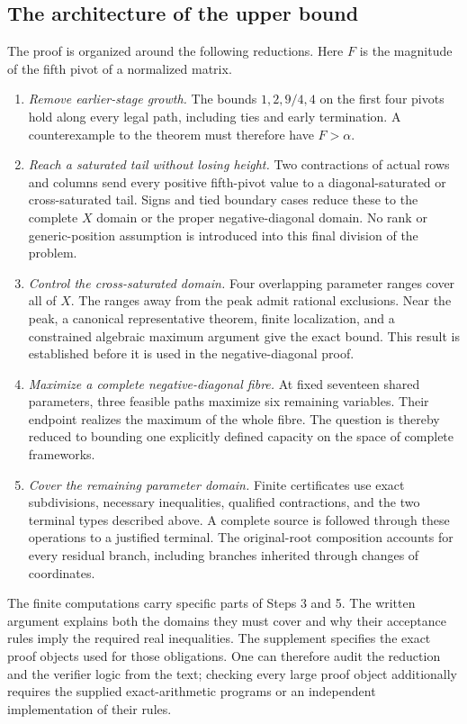 \documentclass[11pt,reqno]{amsart}
\theoremstyle{definition}
\theoremstyle{remark}
\begin{document}
\subsection*{The architecture of the upper bound}
The proof is organized around the following reductions. Here \(F\) is
the magnitude of the fifth pivot of a normalized matrix.
\begin{enumerate}
\item \emph{Remove earlier-stage growth.}
The bounds \(1,2,9/4,4\) on the first four pivots hold along every
legal path, including ties and early termination. A counterexample to
the theorem must therefore have \(F>\alpha\).
\item \emph{Reach a saturated tail without losing height.}
Two contractions of actual rows and columns send every positive
fifth-pivot value to a diagonal-saturated or cross-saturated tail.
Signs and tied boundary cases reduce these to the complete \(X\) domain
or the proper negative-diagonal domain. No rank or generic-position
assumption is introduced into this final division of the problem.
\item \emph{Control the cross-saturated domain.}
Four overlapping parameter ranges cover all of \(X\). The ranges away
from the peak admit rational exclusions. Near the peak, a canonical
representative theorem, finite localization, and a constrained algebraic
maximum argument give the exact bound. This result is established before
it is used in the negative-diagonal proof.
\item \emph{Maximize a complete negative-diagonal fibre.}
At fixed seventeen shared parameters, three feasible paths maximize six
remaining variables. Their endpoint realizes the maximum of the whole
fibre. The question is thereby reduced to bounding one explicitly defined
capacity on the space of complete frameworks.
\item \emph{Cover the remaining parameter domain.}
Finite certificates use exact subdivisions, necessary inequalities,
qualified contractions, and the two terminal types described above.
A complete source is followed through these operations to a justified
terminal. The original-root composition accounts for every residual
branch, including branches inherited through changes of coordinates.
\end{enumerate}

The finite computations carry specific parts of Steps 3 and 5. The
written argument explains both the domains they must cover and why their
acceptance rules imply the required real inequalities. The supplement
specifies the exact proof objects used for those obligations. One can
therefore audit the reduction and the verifier logic from the text;
checking every large proof object additionally requires the supplied
exact-arithmetic programs or an independent implementation of their rules.
\end{document}
